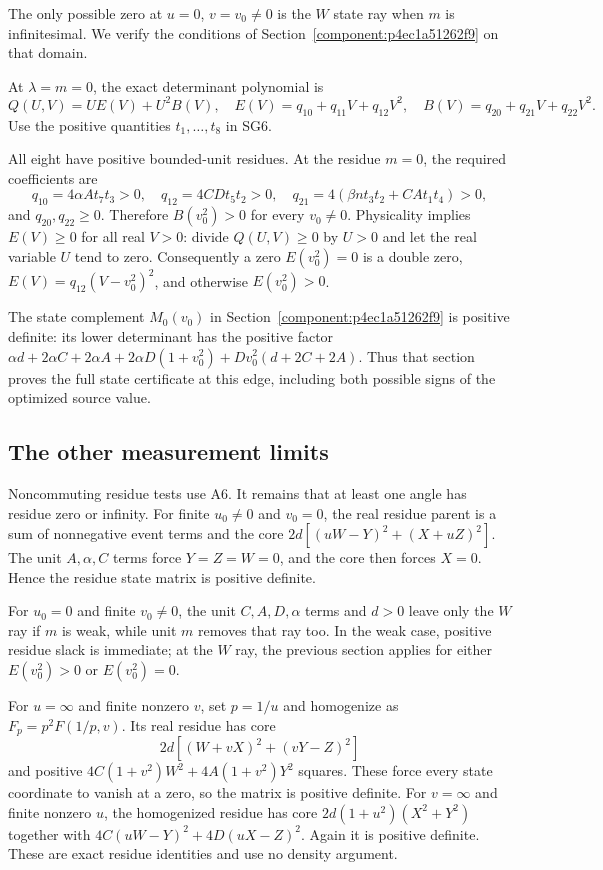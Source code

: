 The only possible zero at $u=0$, $v=v_0\ne0$ is the $W$ state
ray when $m$ is infinitesimal. We verify the conditions of
Section~\ref{component:p4ec1a51262f9} on that domain.

At $\lambda=m=0$, the exact determinant polynomial is
\[
 Q(U,V)=U E(V)+U^2 B(V),\quad
 E(V)=q_{10}+q_{11}V+q_{12}V^2,\quad
 B(V)=q_{20}+q_{21}V+q_{22}V^2.
\]
Use the positive quantities $t_1,\ldots,t_8$ in SG6.

All eight have positive bounded-unit residues. At the residue $m=0$,
the required coefficients are
\[
 q_{10}=4\alpha A t_7t_3>0,\quad
 q_{12}=4CDt_5t_2>0,\quad
 q_{21}=4(\beta n t_3t_2+CA t_1t_4)>0,
\]
and $q_{20},q_{22}\geq0$. Therefore $B(v_0^2)>0$ for every
$v_0\ne0$. Physicality implies $E(V)\geq0$ for all real $V>0$:
divide $Q(U,V)\geq0$ by $U>0$ and let the real variable $U$ tend to
zero. Consequently a zero $E(v_0^2)=0$ is a double zero,
$E(V)=q_{12}(V-v_0^2)^2$, and otherwise $E(v_0^2)>0$.

The state complement $M_0(v_0)$ in
Section~\ref{component:p4ec1a51262f9} is positive definite: its
lower determinant has the positive factor
$\alpha d+2\alpha C+2\alpha A+2\alpha D(1+v_0^2)
+Dv_0^2(d+2C+2A)$. Thus that section proves the full state
certificate at this edge, including both possible signs of the
optimized source value.



\subsection*{The other measurement limits}

Noncommuting residue tests use A6. It remains that at least one angle
has residue zero or infinity. For finite $u_0\ne0$ and $v_0=0$,
the real residue parent is a sum of nonnegative event terms and the
core $2d[(uW-Y)^2+(X+uZ)^2]$. The unit $A,\alpha,C$ terms
force $Y=Z=W=0$, and the core then forces $X=0$.
Hence the residue state matrix is positive definite.

For $u_0=0$ and finite $v_0\ne0$, the unit $C,A,D,\alpha$ terms
and $d>0$ leave only the $W$ ray if $m$ is weak, while unit $m$
removes that ray too. In the weak case, positive residue slack is
immediate; at the $W$ ray, the previous section applies for either
$E(v_0^2)>0$ or $E(v_0^2)=0$.

For $u=\infty$ and finite nonzero $v$, set $p=1/u$ and homogenize
as $F_p=p^2F(1/p,v)$. Its real residue has core
\[
 2d[(W+vX)^2+(vY-Z)^2]
\]
and positive $4C(1+v^2)W^2+4A(1+v^2)Y^2$ squares. These
force every state coordinate to vanish at a zero, so the matrix is
positive definite. For $v=\infty$ and finite nonzero $u$, the
homogenized residue has core $2d(1+u^2)(X^2+Y^2)$ together with
$4C(uW-Y)^2+4D(uX-Z)^2$. Again it is positive definite.
These are exact residue identities and use no density argument.

